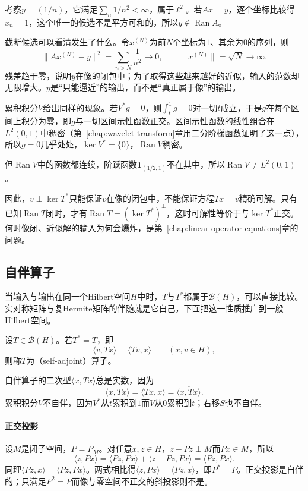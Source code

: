 考察$y=(1/n)$，它满足$\sum_n1/n^2<\infty$，属于$\ell^2$。若$Ax=y$，逐个坐标比较得$x_n=1$，这个唯一的候选不是平方可和的，所以$y\notin\operatorname{Ran}A$。

截断候选可以看清发生了什么。令$x^{(N)}$为前$N$个坐标为$1$、其余为$0$的序列，则
\[
 \lVert Ax^{(N)}-y\rVert^2=\sum_{n>N}\frac{1}{n^2}\to0,\qquad\lVert x^{(N)}\rVert=\sqrt N\to\infty .
\]
残差趋于零，说明$y$在像的闭包中；为了取得这些越来越好的近似，输入的范数却无限增大。$y$是“只能逼近”的输出，而不是“真正属于像”的输出。

累积积分$V$给出同样的现象。若$V^*g=0$，则$\int_t^1g=0$对一切$t$成立，于是$g$在每个区间上积分为零，即$g$与一切区间示性函数正交。区间示性函数的线性组合在$L^2(0,1)$中稠密（第~\ref{chap:wavelet-transform}章用二分阶梯函数证明了这一点），所以$g=0$几乎处处，$\ker V^*=\{0\}$，$\operatorname{Ran}V$稠密。

但$\operatorname{Ran}V$中的函数都连续，阶跃函数$\mathbf 1_{(1/2,1)}$不在其中，所以$\operatorname{Ran}V\neq L^2(0,1)$。

因此，$v\perp\ker T^*$只能保证$v$在像的闭包中，不能保证方程$Tx=v$精确可解。只有已知$\operatorname{Ran}T$闭时，才有$\operatorname{Ran}T=(\ker T^*)^\perp$，这时可解性等价于与$\ker T^*$正交。何时像闭、近似解的输入为何会爆炸，是第~\ref{chap:linear-operator-equations}章的问题。

\subsection{自伴算子}
\label{sec:lop-self-adjoint}

当输入与输出在同一个Hilbert空间$H$中时，$T$与$T^*$都属于$\mathcal B(H)$，可以直接比较。实对称矩阵与复Hermite矩阵的伴随就是它自己，下面把这一性质推广到一般Hilbert空间。

\begin{definition}[自伴算子]
\label{def:lop-self-adjoint}
设$T\in\mathcal B(H)$。若$T^*=T$，即
\begin{equation}
 \langle v,Tx\rangle=\langle Tv,x\rangle\qquad(x,v\in H),
 \label{eq:lop-self-adjoint}
\end{equation}
则称$T$为（self-adjoint）算子。
\end{definition}

自伴算子的二次型$\langle x,Tx\rangle$总是实数，因为
\[
 \langle x,Tx\rangle=\langle Tx,x\rangle=\overline{\langle x,Tx\rangle}.
\]
累积积分$V$不自伴，因为$V^*$从$t$累积到$1$而$V$从$0$累积到$t$；右移$S$也不自伴。

\paragraph{正交投影}
设$M$是闭子空间，$P=P_M$。对任意$x,z\in H$，$z-Pz\perp M$而$Px\in M$，所以
\[
 \langle z,Px\rangle=\langle Pz,Px\rangle+\langle z-Pz,Px\rangle=\langle Pz,Px\rangle.
\]
同理$\langle Pz,x\rangle=\langle Pz,Px\rangle$。两式相比得$\langle z,Px\rangle=\langle Pz,x\rangle$，即$P^*=P$。正交投影是自伴的；只满足$P^2=P$而像与零空间不正交的斜投影则不是。


